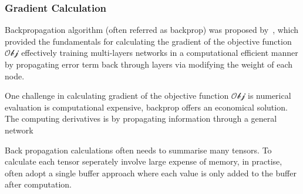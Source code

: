 \subsubsection{Gradient Calculation}
Backpropagation algorithm (often referred as backprop) was proposed by~\citet{werbos1975beyond}, which provided the fundamentals for calculating the gradient of the objective function $\mathcal{Obj}$ effectively  training multi-layers networks in a computational efficient manner by propagating error term back through layers via modifying the weight of each node. 
\par
One challenge in calculating gradient of the objective function $\mathcal{Obj}$ is numerical evaluation is computational expensive, backprop offers an economical solution. The computing derivatives is by propagating information through a general network 
\par 
Back propagation calculations often needs to summarise many tensors. To calculate each tensor seperately involve large expense of memory, in practise, often adopt a single buffer approach where each value is only added to the buffer after computation.